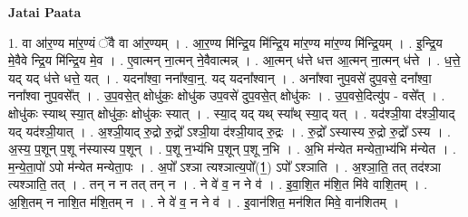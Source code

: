 \documentclass[17pt]{extarticle}
\begin{document}
\textbf{Jatai Paata} \newline

1. वा आ॑र॒ण्य मा॑र॒ण्यं ॅवै वा आ॑र॒ण्यम् । . आ॒र॒ण्य मि॑न्द्रि॒य मि॑न्द्रि॒य मा॑र॒ण्य मा॑र॒ण्य मि॑न्द्रि॒यम् । . इ॒न्द्रि॒य मे॒वैवे न्द्रि॒य मि॑न्द्रि॒य मे॒व । . ए॒वात्मन् ना॒त्मन् ने॒वैवात्मन्न् । . आ॒त्मन् ध॑त्ते धत्त आ॒त्मन् ना॒त्मन् ध॑त्ते । . ध॒त्ते॒ यद् यद् ध॑त्ते धत्ते॒ यत् । . यदना᳚श्वा॒ नना᳚श्वा॒न्॒. यद् यदना᳚श्वान् । . अना᳚श्वा नुप॒वसे॑ दुप॒वसे॒ दना᳚श्वा॒ नना᳚श्वा नुप॒वसे᳚त् । . उ॒प॒वसे॒त् क्षोधु॑कः॒ क्षोधु॑क उप॒वसे॑ दुप॒वसे॒त् क्षोधु॑कः । . उ॒प॒वसे॒दित्यु॑प - वसे᳚त् । . क्षोधु॑कः स्याथ् स्या॒त् क्षोधु॑कः॒ क्षोधु॑कः स्यात् । . स्या॒द् यद् यथ् स्या᳚थ् स्या॒द् यत् । . यद॑श्ञी॒या द॑श्ञी॒याद् यद् यद॑श्ञी॒यात् । . अ॒श्ञी॒याद् रु॒द्रो रु॒द्रो᳚ ऽश्ञी॒या द॑श्ञी॒याद् रु॒द्रः । . रु॒द्रो᳚ ऽस्यास्य रु॒द्रो रु॒द्रो᳚ ऽस्य । . अ॒स्य॒ प॒शून् प॒शू न॑स्यास्य प॒शून् । . प॒शू न॒भ्य॑भि प॒शून् प॒शू न॒भि । . अ॒भि म॑न्येत मन्येता॒भ्य॑भि म॑न्येत । . म॒न्ये॒ता॒पो॑ ऽपो म॑न्येत मन्येता॒पः । . अ॒पो᳚ ऽश्ञा त्यश्ञात्य॒पो᳚(1॒) ऽपो᳚ ऽश्ञाति । . अ॒श्ञा॒ति॒ तत् तद॑श्ञा त्यश्ञाति॒ तत् । . तन् न न तत् तन् न । . ने वे॑ व॒ न ने व॑ । . इ॒वा॒शि॒त म॑शि॒त मि॑वे वाशि॒तम् । . अ॒शि॒तम् न नाशि॒त म॑शि॒तम् न । . ने वे॑ व॒ न ने व॑ । . इ॒वान॑शित॒ मन॑शित मिवे॒ वान॑शितम् । \newline
\end{document}
